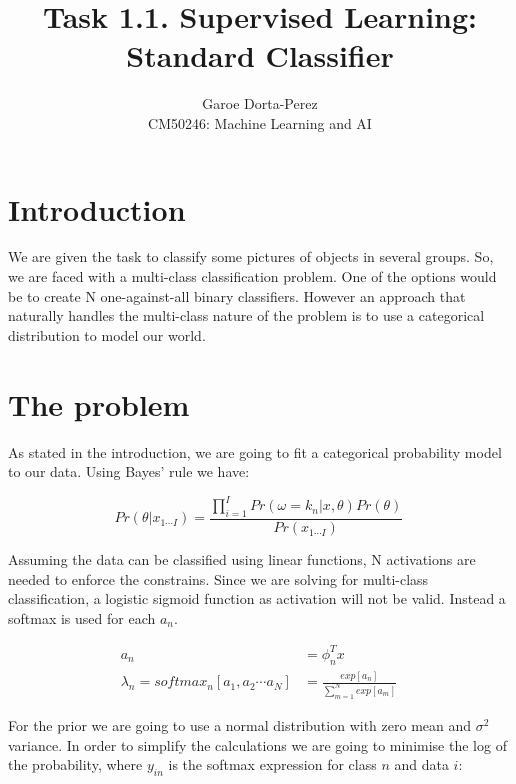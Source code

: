 \documentclass[12pt]{article}
\begin{document}
  
\title{Task 1.1. Supervised Learning: Standard Classifier}
\author{Garoe Dorta-Perez\\
CM50246: Machine Learning and AI}
 
\maketitle
 
\section{Introduction}
 
We are given the task to classify some pictures of objects in several groups.
So, we are faced with a multi-class classification problem.
One of the options would be to create N one-against-all binary classifiers.
However an approach that naturally handles the multi-class nature of the problem is to use a categorical distribution to model our world. 

\section{The problem}

As stated in the introduction, we are going to fit a categorical probability model to our data.
Using Bayes' rule we have:

\begin{equation}
\label{bayes}
Pr(\theta | x_{1 \cdots I}) = \frac{\prod_{i = 1}^{I} Pr(\omega = k_{n} | x, \theta) Pr(\theta)} {Pr(x_{1 \cdots I})}\,
\end{equation}

Assuming the data can be classified using linear functions, N activations are needed to enforce the constrains.
Since we are solving for multi-class classification, a logistic sigmoid function as activation will not be valid.
Instead a softmax is used for each $a_{n}$.

\begin{align}
\label{activations}
a_{n} &= \phi_{n}^{T}x \\
\lambda_{n} = softmax_{n}[a_{1}, a_{2} \cdots a_{N}] &= 
\frac{exp[a_{n}]} {\sum_{m = 1}^{N} exp[a_{m}] }\,
\end{align}

For the prior we are going to use a normal distribution with zero mean and $\sigma^{2}$ variance.
In order to simplify the calculations we are going to minimise the log of the probability, where $y_{in}$ is the softmax expression for class $n$ and data $i$:
\end{document}
